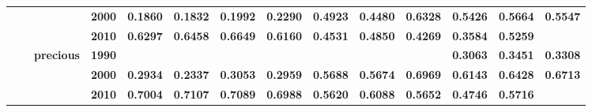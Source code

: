 \documentclass[
  authoryear,
  preprint,
  3p]{elsarticle}
\begin{document}
\begin{landscape}
\begin{longtable}[t]{>{}l>{}l>{}l>{}l>{}r>{}r>{}r>{}r>{}r>{}r>{}r>{}r>{}r>{}r}
\textbf{} & \textbf{} & \textbf{} & \textbf{2000} & \textcolor[HTML]{4285f4}{\textbf{0.1860}} & \textcolor[HTML]{4285f4}{\textbf{0.1832}} & \textcolor[HTML]{4285f4}{\textbf{0.1992}} & \textcolor[HTML]{4285f4}{\textbf{0.2290}} & \textcolor[HTML]{4285f4}{\textbf{0.4923}} & \textcolor[HTML]{4285f4}{\textbf{0.4480}} & \textcolor[HTML]{4285f4}{\textbf{0.6328}} & \textcolor[HTML]{4285f4}{\textbf{0.5426}} & \textcolor[HTML]{4285f4}{\textbf{0.5664}} & \textcolor[HTML]{4285f4}{\textbf{0.5547}}\\
\textbf{} & \textbf{} & \textbf{} & \textbf{2010} & \textcolor[HTML]{4285f4}{\textbf{0.6297}} & \textcolor[HTML]{4285f4}{\textbf{0.6458}} & \textcolor[HTML]{4285f4}{\textbf{0.6649}} & \textcolor[HTML]{4285f4}{\textbf{0.6160}} & \textcolor[HTML]{4285f4}{\textbf{0.4531}} & \textcolor[HTML]{4285f4}{\textbf{0.4850}} & \textcolor[HTML]{4285f4}{\textbf{0.4269}} & \textcolor[HTML]{4285f4}{\textbf{0.3584}} & \textcolor[HTML]{4285f4}{\textbf{0.5259}} & \textcolor[HTML]{4285f4}{\textbf{}}\\
\textbf{} & \textbf{} & \textbf{precious} & \textbf{1990} & \textcolor[HTML]{4285f4}{\textbf{}} & \textcolor[HTML]{4285f4}{\textbf{}} & \textcolor[HTML]{4285f4}{\textbf{}} & \textcolor[HTML]{4285f4}{\textbf{}} & \textcolor[HTML]{4285f4}{\textbf{}} & \textcolor[HTML]{4285f4}{\textbf{}} & \textcolor[HTML]{4285f4}{\textbf{}} & \textcolor[HTML]{4285f4}{\textbf{0.3063}} & \textcolor[HTML]{4285f4}{\textbf{0.3451}} & \textcolor[HTML]{4285f4}{\textbf{0.3308}}\\
\textbf{} & \textbf{} & \textbf{} & \textbf{2000} & \textcolor[HTML]{4285f4}{\textbf{0.2934}} & \textcolor[HTML]{4285f4}{\textbf{0.2337}} & \textcolor[HTML]{4285f4}{\textbf{0.3053}} & \textcolor[HTML]{4285f4}{\textbf{0.2959}} & \textcolor[HTML]{4285f4}{\textbf{0.5688}} & \textcolor[HTML]{4285f4}{\textbf{0.5674}} & \textcolor[HTML]{4285f4}{\textbf{0.6969}} & \textcolor[HTML]{4285f4}{\textbf{0.6143}} & \textcolor[HTML]{4285f4}{\textbf{0.6428}} & \textcolor[HTML]{4285f4}{\textbf{0.6713}}\\
\textbf{} & \textbf{} & \textbf{} & \textbf{2010} & \textcolor[HTML]{4285f4}{\textbf{0.7004}} & \textcolor[HTML]{4285f4}{\textbf{0.7107}} & \textcolor[HTML]{4285f4}{\textbf{0.7089}} & \textcolor[HTML]{4285f4}{\textbf{0.6988}} & \textcolor[HTML]{4285f4}{\textbf{0.5620}} & \textcolor[HTML]{4285f4}{\textbf{0.6088}} & \textcolor[HTML]{4285f4}{\textbf{0.5652}} & \textcolor[HTML]{4285f4}{\textbf{0.4746}} & \textcolor[HTML]{4285f4}{\textbf{0.5716}} & \textcolor[HTML]{4285f4}{\textbf{}}\\

\end{longtable}
\end{landscape}
\end{document}

